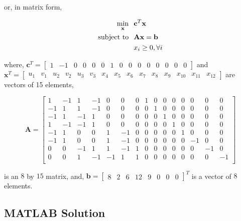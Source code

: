 \documentclass{article}
\begin{document}
\noindent or, in matrix form,

\begin{align*}
\min_\mathbf{x} & \hspace{0.1in} \mathbf{c}^T \mathbf{x}\\
\text{subject to} & \hspace{0.1in} \mathbf{A} \mathbf{x} = \mathbf{b}\\
& \hspace{0.1in} x_i \ge 0, \forall i
\end{align*}

\noindent where, $\mathbf{c}^T = \left[ \begin{smallmatrix}1 & -1 & 0 & 0 & 0 & 0 & 1 & 0 & 0 & 0 & 0 & 0 & 0 & 0 & 0\end{smallmatrix} \right]$ and $\mathbf{x}^T = \left[ \begin{smallmatrix}u_1 & v_1 & u_2 & v_2 & u_3 & v_3 & x_4 & x_5 & x_6 & x_7 & x_8 & x_9 & x_{10} & x_{11} & x_{12}\end{smallmatrix} \right]$ are vectors of 15 elements,

\begin{equation*}
\mathbf{A} = \left[ \begin{smallmatrix}
1 & -1 & 1 & -1 & 0 & 0 & 0 & 1 & 0 & 0 & 0 & 0 & 0 & 0 & 0\\
-1 & 1 & 1 & -1 & 0 & 0 & 0 & 0 & 1 & 0 & 0 & 0 & 0 & 0 & 0\\
-1 & 1 & -1 & 1 & 0 & 0 & 0 & 0 & 0 & 1 & 0 & 0 & 0 & 0 & 0\\
1 & -1 & -1 & 1 & 0 & 0 & 0 & 0 & 0 & 0 & 1 & 0 & 0 & 0 & 0\\
-1 & 1 & 0 & 0 & 1 & -1 & 0 & 0 & 0 & 0 & 0 & 1 & 0 & 0 & 0\\
-1 & 1 & 0 & 0 & 1 & -1 & 0 & 0 & 0 & 0 & 0 & 0 & -1 & 0 & 0\\
0 & 0 & -1 & 1 & 1 & -1 & 1 & 0 & 0 & 0 & 0 & 0 & 0 & -1 & 0\\
0 & 0 & 1 & -1 & -1 & 1 & 1 & 0 & 0 & 0 & 0 & 0 & 0 & 0 & -1\\
\end{smallmatrix} \right]
\end{equation*}

\noindent is an $8$ by $15$ matrix, and, $\mathbf{b} = \begin{bmatrix}
8&
2&
6&
12&
9&
0&
0&
0
\end{bmatrix}^T$ is a vector of $8$ elements.

\subsection{MATLAB Solution}
\end{document}
